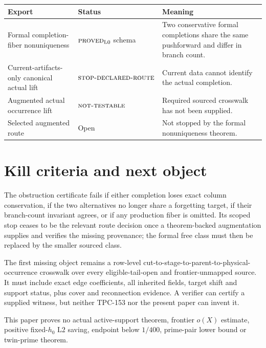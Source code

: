 \documentclass[11pt]{article}
\theoremstyle{definition}
\theoremstyle{remark}
\newcommand{\NT}{\textnormal{\textsc{not-testable}}}
\newcommand{\PROVED}{\textnormal{\textsc{proved}}}
\newcommand{\STOP}{\textnormal{\textsc{stop-declared-route}}}
\newcommand{\Lzero}{\mathrm{L0}}
\newcommand{\Ltwo}{\mathrm{L2}}
\begin{document}
\begin{center}
\small
\begin{tabularx}{\textwidth}{@{}P{0.38\textwidth}P{0.22\textwidth}Y@{}}
\toprule
Export & Status & Meaning\\
\midrule
Formal completion-fiber nonuniqueness
& \(\PROVED_{\Lzero}\) schema & Two conservative formal completions share
the same pushforward and differ in branch count.\\
Current-artifacts-only canonical actual lift
& \(\STOP\) & Current data cannot identify the actual completion.\\
Augmented actual occurrence lift
& \(\NT\) & Required sourced crosswalk has not been supplied.\\
Selected augmented route & Open & Not stopped by the formal
nonuniqueness theorem.\\
\bottomrule
\end{tabularx}
\end{center}

\section{Kill criteria and next object}

The obstruction certificate fails if either completion loses exact
column conservation, if the two alternatives no longer share a
forgetting target, if their branch-count invariant agrees, or if any
production fiber is omitted.  Its scoped stop ceases to be the
relevant route decision once a theorem-backed augmentation supplies
and verifies the missing provenance; the formal free class must then
be replaced by the smaller sourced class.

The first missing object remains a row-level
cut-to-stage-to-parent-to-physical-occurrence crosswalk over every
eligible-tail-open and frontier-unmapped source.  It must include
exact edge coefficients, all inherited fields, target shift and
support status, plus cover and reconnection evidence.  A verifier can
certify a supplied witness, but neither TPC-153 nor the present paper
can invent it.

This paper proves no actual active-support theorem, frontier \(o(X)\)
estimate, positive fixed-\(h_0\) \(\Ltwo\) saving, endpoint below
\(1/400\), prime-pair lower bound or twin-prime theorem.

\begingroup
\small
\raggedright


\endgroup
\end{document}
